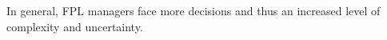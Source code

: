 In general, FPL managers face more decisions and thus an increased level of complexity and uncertainty. 

\newpar

\begin{comment}
As can seen from the works above, the amount of academic articles on Fantasy Sports are restricted. As for the use of operations research in Fantasy Sports, the number of articles are even fewer and most of the work is concerned NFL Fantasy Draft. As mentioned earlier, this may be due to the big money prices in this game. No academic works were found on the use of operations research on Fantasy Premier League. This thesis is the first to use operations research in Fantasy Premier League, and is solved using forecasting to predict player performance.
\end{comment}
 

\begin{comment}
- på samme måte at man har en budget limit finnes det også budget constraints i portfolio. 
- i portfolio kan man investere fraksjoner i assets, mens i FPLDP er valgene binary, enten er spilleren med på laget eller ikke. 
- en forskjell er også at i FPLDP har man en limit på hvor mange spillere man skal ha totalt, men også en grense på antall spillere i forskjellige roller, mens i portfolje er vanligvis asset classes ikke gitt på forhånd. 
- risk er et viktig og vanlig aspekt i portfølge optimeringen
- skrive om daily fantasy sports artikkelen 
\end{comment}



